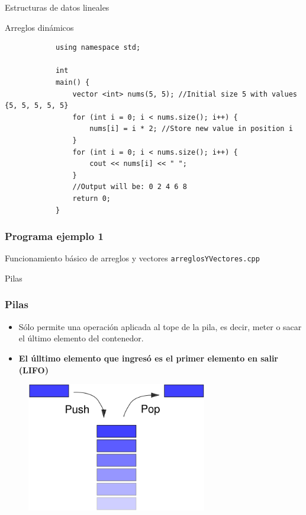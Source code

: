 \documentclass{beamer}
\begin{document}
\begin{section}{Estructuras de datos lineales}
\begin{subsection}{Arreglos dinámicos}
\begin{frame}[fragile]
\begin{lstlisting}
			using namespace std;
			
			int
			main() {
			    vector <int> nums(5, 5); //Initial size 5 with values {5, 5, 5, 5, 5}
			    for (int i = 0; i < nums.size(); i++) {
			        nums[i] = i * 2; //Store new value in position i
			    }
			    for (int i = 0; i < nums.size(); i++) {
			        cout << nums[i] << " ";
			    }
			    //Output will be: 0 2 4 6 8
			    return 0;
			}
		\end{lstlisting}
	\end{frame}

	\begin{frame}[fragile]
		\frametitle{Programa ejemplo 1}
		 Funcionamiento básico de arreglos y vectores
		\texttt{arreglosYVectores.cpp}\\

	\end{frame}
\end{subsection}

\begin{subsection}{Pilas}

	\begin{frame}[fragile]
		\frametitle{Pilas}
		\begin{itemize}
			\item {Sólo permite una operación aplicada al tope de la pila, es decir, meter o sacar el último elemento del contenedor.}
			\item {\textbf{El úlltimo elemento que ingresó es el primer elemento en salir (LIFO)}}
		\end{itemize}
		\begin{figure}
			\includegraphics[width = 0.7\textwidth]{src/pila.jpg}
		\end{figure}
	\end{frame}


\end{subsection}
\end{section}
\end{document}
